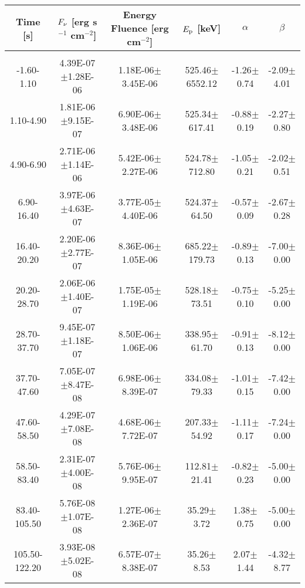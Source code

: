 \begin{table}[h]
\centering
\scriptsize
\label{tab:}
\begin{tabular}{c| c c c c c}
Time [s] & $F_{\nu}$ [erg s$^{-1}$ cm$^{-2}$] & Energy Fluence [erg cm$^{-2}$] & $E_{\rm p}$ [keV] & $\alpha$ & $\beta$ \\
\hline \hline\\ 

-1.60-1.10 & 4.39E-07$\pm$1.28E-06 & 1.18E-06$\pm$3.45E-06 & 525.46$\pm$6552.12 & -1.26$\pm$0.74 & -2.09$\pm$4.01 \\ 

1.10-4.90 & 1.81E-06$\pm$9.15E-07 & 6.90E-06$\pm$3.48E-06 & 525.34$\pm$617.41 & -0.88$\pm$0.19 & -2.27$\pm$0.80 \\ 

4.90-6.90 & 2.71E-06$\pm$1.14E-06 & 5.42E-06$\pm$2.27E-06 & 524.78$\pm$712.80 & -1.05$\pm$0.21 & -2.02$\pm$0.51 \\ 

6.90-16.40 & 3.97E-06$\pm$4.63E-07 & 3.77E-05$\pm$4.40E-06 & 524.37$\pm$64.50 & -0.57$\pm$0.09 & -2.67$\pm$0.28 \\ 

16.40-20.20 & 2.20E-06$\pm$2.77E-07 & 8.36E-06$\pm$1.05E-06 & 685.22$\pm$179.73 & -0.89$\pm$0.13 & -7.00$\pm$0.00 \\ 

20.20-28.70 & 2.06E-06$\pm$1.40E-07 & 1.75E-05$\pm$1.19E-06 & 528.18$\pm$73.51 & -0.75$\pm$0.10 & -5.25$\pm$0.00 \\ 

28.70-37.70 & 9.45E-07$\pm$1.18E-07 & 8.50E-06$\pm$1.06E-06 & 338.95$\pm$61.70 & -0.91$\pm$0.13 & -8.12$\pm$0.00 \\ 

37.70-47.60 & 7.05E-07$\pm$8.47E-08 & 6.98E-06$\pm$8.39E-07 & 334.08$\pm$79.33 & -1.01$\pm$0.15 & -7.42$\pm$0.00 \\ 

47.60-58.50 & 4.29E-07$\pm$7.08E-08 & 4.68E-06$\pm$7.72E-07 & 207.33$\pm$54.92 & -1.11$\pm$0.17 & -7.24$\pm$0.00 \\ 

58.50-83.40 & 2.31E-07$\pm$4.00E-08 & 5.76E-06$\pm$9.95E-07 & 112.81$\pm$21.41 & -0.82$\pm$0.23 & -5.00$\pm$0.00 \\ 

83.40-105.50 & 5.76E-08$\pm$1.07E-08 & 1.27E-06$\pm$2.36E-07 & 35.29$\pm$3.72 & 1.38$\pm$0.75 & -5.00$\pm$0.00 \\ 

105.50-122.20 & 3.93E-08$\pm$5.02E-08 & 6.57E-07$\pm$8.38E-07 & 35.26$\pm$8.53 & 2.07$\pm$1.44 & -4.32$\pm$8.77 \\ 


\end{tabular}
\end{table}
